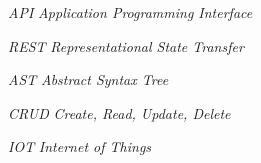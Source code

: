 


\begin{siglas}
    \item[\textit{API}] \textit{Application Programming Interface}
    \item[\textit{REST}] \textit{Representational State Transfer}
    \item[\textit{AST}] \textit{Abstract Syntax Tree}
    \item[\textit{CRUD}] \textit{Create, Read, Update, Delete}
    \item[\textit{IOT}] \textit{Internet of Things}
\end{siglas}

